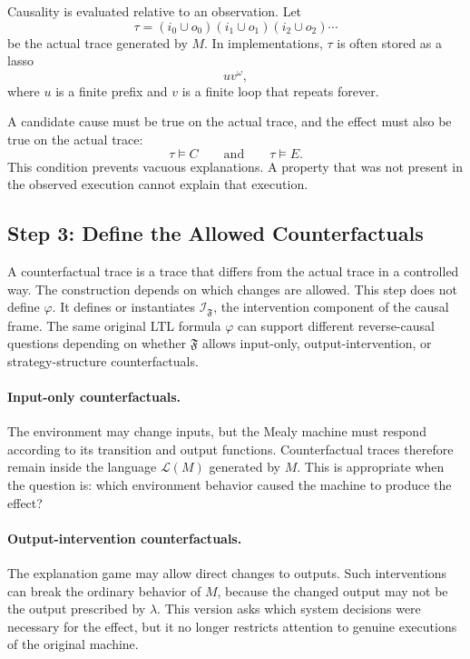 \documentclass[11pt]{article}
\theoremstyle{remark}
\newcommand{\Lang}{\mathcal{L}}
\newcommand{\Frame}{\mathfrak{F}}
\begin{document}
Causality is evaluated relative to an observation. Let
\[
  \tau = (i_0\cup o_0)(i_1\cup o_1)(i_2\cup o_2)\cdots
\]
be the actual trace generated by \(M\). In implementations, \(\tau\) is often
stored as a lasso
\[
  uv^\omega,
\]
where \(u\) is a finite prefix and \(v\) is a finite loop that repeats forever.

A candidate cause must be true on the actual trace, and the effect must also be
true on the actual trace:
\[
  \tau\models C
  \qquad\text{and}\qquad
  \tau\models E .
\]
This condition prevents vacuous explanations. A property that was not present
in the observed execution cannot explain that execution.

\subsection{Step 3: Define the Allowed Counterfactuals}
\label{step:counterfactuals}

A counterfactual trace is a trace that differs from the actual trace in a
controlled way. The construction depends on which changes are allowed.
This step does not define \(\varphi\). It defines or instantiates
\(\mathcal{I}_{\Frame}\), the intervention component of the causal frame. The
same original LTL formula \(\varphi\) can support different reverse-causal
questions depending on whether \(\Frame\) allows input-only,
output-intervention, or strategy-structure counterfactuals.

\paragraph{Input-only counterfactuals.}
The environment may change inputs, but the Mealy machine must respond according
to its transition and output functions. Counterfactual traces therefore remain
inside the language \(\Lang(M)\) generated by \(M\). This is appropriate when
the question is: which environment behavior caused the machine to produce the
effect?

\paragraph{Output-intervention counterfactuals.}
The explanation game may allow direct changes to outputs. Such interventions
can break the ordinary behavior of \(M\), because the changed output may not be
the output prescribed by \(\lambda\). This version asks which system decisions
were necessary for the effect, but it no longer restricts attention to genuine
executions of the original machine.
\end{document}
